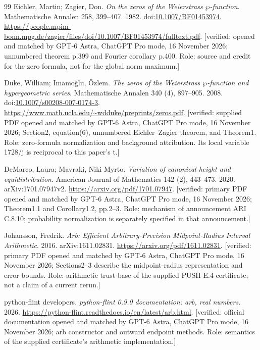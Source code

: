 \documentclass[11pt,a4paper]{article}
\theoremstyle{plain}
\theoremstyle{definition}
\begin{document}
\begin{thebibliography}{99}
Eichler, Martin; Zagier, Don. \emph{On the zeros of the {Weierstrass} $\wp$-function}. Mathematische Annalen 258, 399--407. 1982. doi:\url{10.1007/BF01453974}. \url{https://people.mpim-bonn.mpg.de/zagier/files/doi/10.1007/BF01453974/fulltext.pdf}. [verified: opened and matched by GPT-6 Astra, ChatGPT Pro mode, 16 November 2026; unnumbered theorem p.399 and Fourier corollary p.400. Role: source and credit for the zero formula, not for the global norm maximum.]

Duke, William; Imamo{\u g}lu, {\"O}zlem. \emph{The zeros of the {Weierstrass} $\wp$-function and hypergeometric series}. Mathematische Annalen 340 (4), 897--905. 2008. doi:\url{10.1007/s00208-007-0174-3}. \url{https://www.math.ucla.edu/~wdduke/preprints/zeros.pdf}. [verified: supplied PDF opened and matched by GPT-6 Astra, ChatGPT Pro mode, 16 November 2026; Section2, equation(6), unnumbered Eichler--Zagier theorem, and Theorem1. Role: zero-formula normalization and background attribution. Its local variable 1728/j is reciprocal to this paper's t.]

DeMarco, Laura; Mavraki, Niki Myrto. \emph{Variation of canonical height and equidistribution}. American Journal of Mathematics 142 (2), 443--473. 2020. arXiv:1701.07947v2. \url{https://arxiv.org/pdf/1701.07947}. [verified: primary PDF opened and matched by GPT-6 Astra, ChatGPT Pro mode, 16 November 2026; Theorem1.1 and Corollary1.2, pp.2--3. Role: mechanism of announcement ARI C.8.10; probability normalization is separately specified in that announcement.]

Johansson, Fredrik. \emph{Arb: Efficient Arbitrary-Precision Midpoint-Radius Interval Arithmetic}. 2016. arXiv:1611.02831. \url{https://arxiv.org/pdf/1611.02831}. [verified: primary PDF opened and matched by GPT-6 Astra, ChatGPT Pro mode, 16 November 2026; Sections2--3 describe the midpoint-radius representation and error bounds. Role: arithmetic trust base of the supplied PUSH E.4 certificate; not a claim of a current rerun.]

{python-flint developers}. \emph{python-flint 0.9.0 documentation: arb, real numbers}. 2026. \url{https://python-flint.readthedocs.io/en/latest/arb.html}. [verified: official documentation opened and matched by GPT-6 Astra, ChatGPT Pro mode, 16 November 2026; arb constructor and outward endpoint methods. Role: semantics of the supplied certificate's arithmetic implementation.]


\end{thebibliography}
\end{document}
